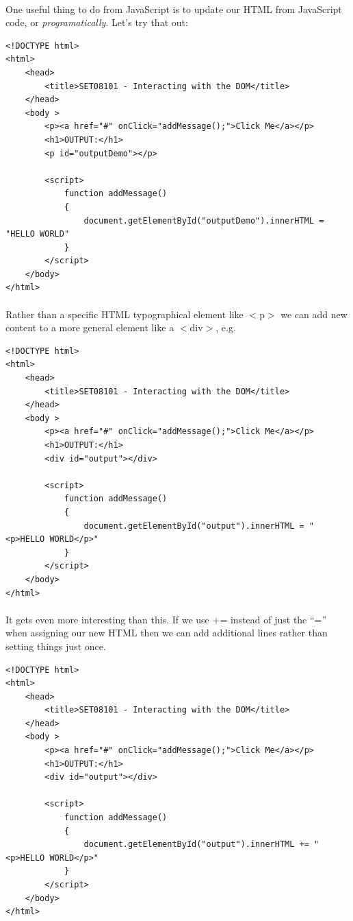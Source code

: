 \documentclass[10pt, a4paper, twosize]{article}
\begin{document}
\paragraph{} One useful thing to do from JavaScript is to update our HTML from JavaScript code, or \emph{programatically}. Let's try that out:

\begin{lstlisting}
<!DOCTYPE html>
<html>
    <head> 
        <title>SET08101 - Interacting with the DOM</title>
    </head>
    <body >
        <p><a href="#" onClick="addMessage();">Click Me</a></p>
        <h1>OUTPUT:</h1>
        <p id="outputDemo"></p>

        <script>
            function addMessage() 
            { 
                document.getElementById("outputDemo").innerHTML = "HELLO WORLD"
            }      
        </script>
    </body>
</html>
\end{lstlisting}

\paragraph{} Rather than a specific HTML typographical element like $<$p$>$ we can add new content to a more general element like a $<$div$>$, e.g.

\begin{lstlisting}
<!DOCTYPE html>
<html>
    <head> 
        <title>SET08101 - Interacting with the DOM</title>
    </head>
    <body >
        <p><a href="#" onClick="addMessage();">Click Me</a></p>
        <h1>OUTPUT:</h1>
        <div id="output"></div>

        <script>
            function addMessage() 
            { 
                document.getElementById("output").innerHTML = "<p>HELLO WORLD</p>"
            }      
        </script>
    </body>
</html>
\end{lstlisting}

\paragraph{} It gets even more interesting than this. If we use += instead of just the ``='' when assigning our new HTML then we can add additional lines rather than setting things just once. 

\begin{lstlisting}
<!DOCTYPE html>
<html>
    <head> 
        <title>SET08101 - Interacting with the DOM</title>
    </head>
    <body >
        <p><a href="#" onClick="addMessage();">Click Me</a></p>
        <h1>OUTPUT:</h1>
        <div id="output"></div>

        <script>
            function addMessage() 
            { 
                document.getElementById("output").innerHTML += "<p>HELLO WORLD</p>"
            }      
        </script>
    </body>
</html>
\end{lstlisting}
\end{document}
